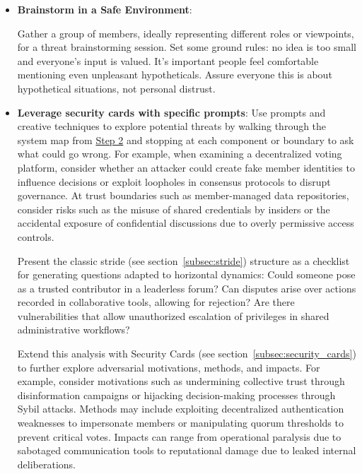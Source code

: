 \begin{itemize}

    \item \textbf{Brainstorm in a Safe Environment}:
    
    Gather a group of members, ideally representing different roles or viewpoints,
    for a threat brainstorming session. Set some ground rules: no idea is
    too small and everyone's input is valued. It's important
    people feel comfortable mentioning even unpleasant hypotheticals.
    Assure everyone this is about hypothetical situations,
    not personal distrust.

    \item \textbf{Leverage security cards with specific prompts}: Use
    prompts and creative techniques to explore potential threats by walking through
    the system map from \hyperref[subsec:Step2]{Step 2} and stopping at each
    component or boundary to ask what could go wrong. For example, when examining a
    decentralized voting platform, consider whether an attacker could create fake
    member identities to influence decisions or exploit loopholes in consensus
    protocols to disrupt governance. At trust boundaries such as member-managed data
    repositories, consider risks such as the misuse of shared credentials by
    insiders or the accidental exposure of confidential discussions due to overly
    permissive access controls.

    Present the classic \gls{stride} (see section~\ref{subsec:stride}) structure as a checklist for generating
    questions adapted to horizontal dynamics: Could someone pose as a trusted
    contributor in a leaderless forum? Can disputes arise over actions recorded in
    collaborative tools, allowing for rejection? Are there vulnerabilities that
    allow unauthorized escalation of privileges in shared administrative workflows?

    Extend this analysis with Security Cards (see section~\ref{subsec:security_cards}) to further explore
    adversarial motivations, methods, and impacts. For example, consider motivations such as
    undermining collective trust through disinformation campaigns or hijacking
    decision-making processes through Sybil attacks. Methods may include exploiting
    decentralized authentication weaknesses to impersonate members or manipulating
    quorum thresholds to prevent critical votes. Impacts can range from operational
    paralysis due to sabotaged communication tools to reputational damage due to
    leaked internal deliberations.


\end{itemize}
